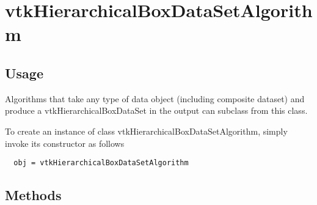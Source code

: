 \section{vtkHierarchicalBoxDataSetAlgorithm}

\subsection{Usage}

 Algorithms that take any type of data object (including composite dataset)
 and produce a vtkHierarchicalBoxDataSet in the output can subclass from this
 class.

To create an instance of class vtkHierarchicalBoxDataSetAlgorithm, simply
invoke its constructor as follows
\begin{verbatim}
  obj = vtkHierarchicalBoxDataSetAlgorithm
\end{verbatim}
\subsection{Methods}

